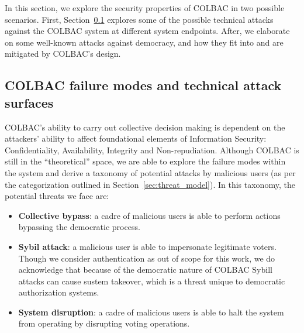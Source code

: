In this section, we explore the security properties of COLBAC in two possible
scenarios.  First, Section~\ref{sec:technical} explores some of the possible
technical attacks against the COLBAC system at different system endpoints.
After, we elaborate on some well-known attacks against democracy, and how they
fit into and are mitigated by COLBAC's design.


\subsection{COLBAC failure modes and technical attack surfaces}
\label{sec:technical}
COLBAC's ability to carry out collective decision making is dependent on the
attackers' ability to affect foundational elements of Information Security:
Confidentiality, Availability, Integrity and Non-repudiation. Although COLBAC
is still in the ``theoretical'' space, we are able to explore the failure modes
within the system and derive a taxonomy of potential attacks by malicious users
(as per the categorization outlined in Section~\ref{sec:threat_model}). In this
taxonomy, the potential threats we face are:

\begin{itemize}
    \item {\bf Collective bypass}: a cadre of malicious users is able
        to perform actions bypassing the democratic process.

    \item {\bf Sybil attack}: a malicious user is able
        to impersonate legitimate voters. Though we consider authentication as
        out of scope for this work, we do acknowledge that because of the
        democratic nature of COLBAC Sybill attacks can cause sustem takeover,
        which is a threat unique to democratic authorization systems.

    \item {\bf System disruption}: a cadre of malicious users is able to halt
        the system from operating by disrupting voting operations.

\end{itemize}

